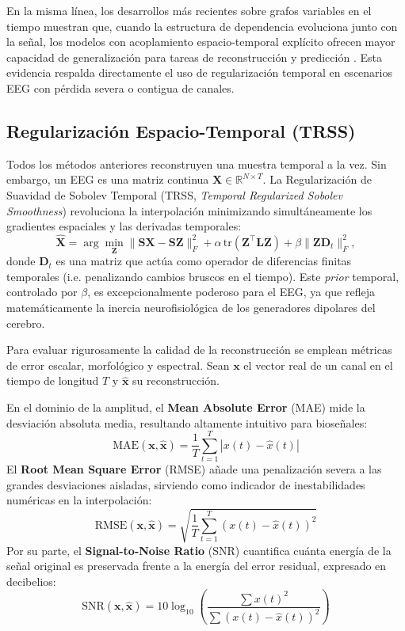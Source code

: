 En la misma línea, los desarrollos más recientes sobre grafos variables en el tiempo muestran que, cuando la estructura de dependencia evoluciona junto con la señal, los modelos con acoplamiento espacio-temporal explícito ofrecen mayor capacidad de generalización para tareas de reconstrucción y predicción \cite{yan_signal_2026, krishnan_learning_2026}. Esta evidencia respalda directamente el uso de regularización temporal en escenarios EEG con pérdida severa o contigua de canales.

\subsection{Regularización Espacio-Temporal (TRSS)}
Todos los métodos anteriores reconstruyen una muestra temporal a la vez. Sin embargo, un EEG es una matriz continua $\mathbf{X} \in \mathbb{R}^{N \times T}$. La Regularización de Suavidad de Sobolev Temporal (TRSS, \textit{Temporal Regularized Sobolev Smoothness}) \cite{giraldo2022} revoluciona la interpolación minimizando simultáneamente los gradientes espaciales y las derivadas temporales:
\begin{equation}
    \hat{\mathbf{X}} = \arg\min_{\mathbf{Z}} \| \mathbf{S}\mathbf{X} - \mathbf{S}\mathbf{Z} \|_F^2 + \alpha \, \text{tr}(\mathbf{Z}^\top \mathbf{L} \mathbf{Z}) + \beta \| \mathbf{Z}\mathbf{D}_t \|_F^2,
    \label{eq:trss_obj}
\end{equation}
donde $\mathbf{D}_t$ es una matriz que actúa como operador de diferencias finitas temporales (i.e. penalizando cambios bruscos en el tiempo). Este \textit{prior} temporal, controlado por $\beta$, es excepcionalmente poderoso para el EEG, ya que refleja matemáticamente la inercia neurofisiológica de los generadores dipolares del cerebro.

Para evaluar rigurosamente la calidad de la reconstrucción se emplean métricas de error escalar, morfológico y espectral. Sean $\mathbf{x}$ el vector real de un canal en el tiempo de longitud $T$ y $\hat{\mathbf{x}}$ su reconstrucción.

En el dominio de la amplitud, el \textbf{Mean Absolute Error} (MAE) mide la desviación absoluta media, resultando altamente intuitivo para bioseñales:
\begin{equation}
    \text{MAE}(\mathbf{x}, \hat{\mathbf{x}}) = \frac{1}{T} \sum_{t=1}^T | x(t) - \hat{x}(t) |
\end{equation}
El \textbf{Root Mean Square Error} (RMSE) añade una penalización severa a las grandes desviaciones aisladas, sirviendo como indicador de inestabilidades numéricas en la interpolación:
\begin{equation}
    \text{RMSE}(\mathbf{x}, \hat{\mathbf{x}}) = \sqrt{\frac{1}{T} \sum_{t=1}^T (x(t) - \hat{x}(t))^2}
\end{equation}
Por su parte, el \textbf{Signal-to-Noise Ratio} (SNR) cuantifica cuánta energía de la señal original es preservada frente a la energía del error residual, expresado en decibelios:
\begin{equation}
    \text{SNR}(\mathbf{x}, \hat{\mathbf{x}}) = 10 \log_{10} \left( \frac{\sum x(t)^2}{\sum (x(t) - \hat{x}(t))^2} \right)
\end{equation}

